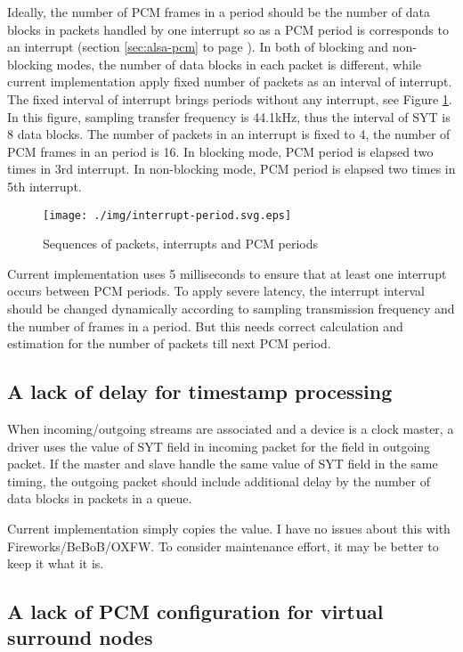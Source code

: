 \documentclass[onecolumn]{jarticle}
\begin{document}
Ideally, the number of PCM frames in a period should be the number of data blocks in packets handled by one interrupt so as a PCM period is corresponds to an interrupt (section \ref{sec:alsa-pcm} to page \pageref{sec:alsa-pcm}). In both of blocking and non-blocking modes, the number of data blocks in each packet is different, while current implementation apply fixed number of packets as an interval of interrupt. The fixed interval of interrupt brings periods without any interrupt, see Figure \ref{fig:interrupt-period}. In this figure, sampling transfer frequency is 44.1kHz, thus the interval of SYT is 8 data blocks. The number of packets in an interrupt is fixed to 4, the number of PCM frames in an period is 16. In blocking mode, PCM period is elapsed two times in 3rd interrupt. In non-blocking mode, PCM period is elapsed two times in 5th interrupt.

\begin{figure}[H]
	\centering
	\texttt{[image: ./img/interrupt-period.svg.eps]}
	\caption{{Sequences of packets, interrupts and PCM periods}}
	\label{fig:interrupt-period}
\end{figure}

Current implementation uses 5 milliseconds to ensure that at least one interrupt occurs between PCM periods. To apply severe latency, the interrupt interval should be changed dynamically according to sampling transmission frequency and the number of frames in a period. But this needs correct calculation and estimation for the number of packets till next PCM period.


\subsection{A lack of delay for timestamp processing}

When incoming/outgoing streams are associated and a device is a clock master, a driver uses the value of SYT field in incoming packet for the field in outgoing packet. If the master and slave handle the same value of SYT field in the same timing, the outgoing packet should include additional delay by the number of data blocks in packets in a queue. 

Current implementation simply copies the value. I have no issues about this with Fireworks/BeBoB/OXFW. To consider maintenance effort, it may be better to keep it what it is.

\subsection{A lack of PCM configuration for virtual surround nodes}
\end{document}
